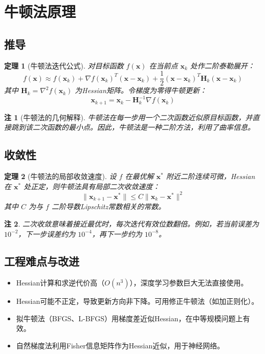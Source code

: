 \documentclass[UTF8, 10pt]{ctexart}
\newtheorem{theorem}{定理}[section]
\newtheorem{remark}{注}[section]
\begin{document}
\section{牛顿法原理}
\subsection{推导}
\begin{theorem}[牛顿法迭代公式]
对目标函数 $f(\bm{x})$ 在当前点 $\bm{x}_k$ 处作二阶泰勒展开：
\[
f(\bm{x}) \approx f(\bm{x}_k) + \nabla f(\bm{x}_k)^T (\bm{x} - \bm{x}_k) + \frac{1}{2} (\bm{x} - \bm{x}_k)^T \bm{H}_k (\bm{x} - \bm{x}_k)
\]
其中 $\bm{H}_k = \nabla^2 f(\bm{x}_k)$ 为Hessian矩阵。令梯度为零得牛顿更新：
\[
\bm{x}_{k+1} = \bm{x}_k - \bm{H}_k^{-1} \nabla f(\bm{x}_k)
\]
\end{theorem}

\begin{remark}[牛顿法的几何解释]
牛顿法在每一步用一个二次函数近似原目标函数，并直接跳到该二次函数的最小点。因此，牛顿法是一种二阶方法，利用了曲率信息。
\end{remark}

\subsection{收敛性}
\begin{theorem}[牛顿法的局部收敛速度]
设 $f$ 在最优解 $\bm{x}^*$ 附近二阶连续可微，Hessian在 $\bm{x}^*$ 处正定，则牛顿法具有局部二次收敛速度：
\[
\|\bm{x}_{k+1} - \bm{x}^*\| \le C \|\bm{x}_k - \bm{x}^*\|^2
\]
其中 $C$ 为与 $f$ 二阶导数Lipschitz常数相关的常数。
\end{theorem}

\begin{remark}
二次收敛意味着接近最优时，每次迭代有效位数翻倍。例如，若当前误差为 $10^{-2}$，下一步误差约为 $10^{-4}$，再下一步约为 $10^{-8}$。
\end{remark}

\subsection{工程难点与改进}
\begin{itemize}
    \item Hessian计算和求逆代价高（$O(n^3)$），深度学习参数巨大无法直接使用。
    \item Hessian可能不正定，导致更新方向非下降。可用修正牛顿法（如加正则化）。
    \item 拟牛顿法（BFGS、L-BFGS）用梯度差近似Hessian，在中等规模问题上有效。
    \item 自然梯度法利用Fisher信息矩阵作为Hessian近似，用于神经网络。
\end{itemize}
\end{document}

